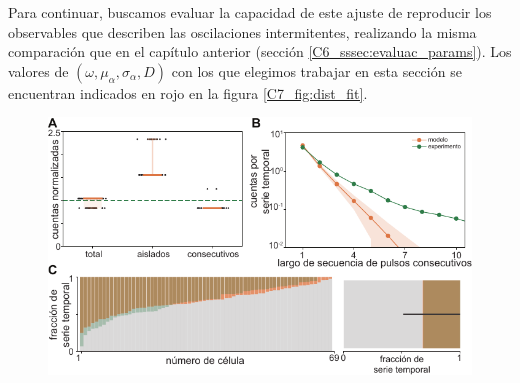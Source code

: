 \documentclass[./main.tex]{subfiles}
\begin{document}
Para continuar, buscamos evaluar la capacidad de este ajuste de reproducir los observables que describen las oscilaciones intermitentes, realizando la misma comparación que en el capítulo anterior (sección \ref{C6_sssec:evaluac_params}). Los valores de $(\omega,\mu_{\alpha},\sigma_{\alpha},D)$ con los que elegimos trabajar en esta sección se encuentran indicados en rojo en la figura \ref{C7_fig:dist_fit}. 

\begin{figure}
    \centering
    \includegraphics[width=1\columnwidth]{figures/chapter7/C7_dist_validation.pdf} 

\end{figure}
\end{document}
